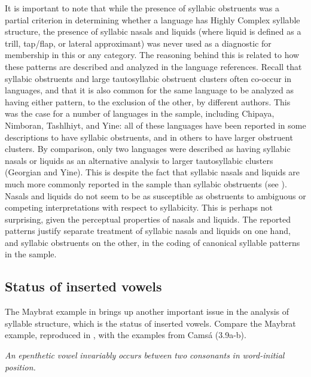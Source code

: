   It is important to note that while the presence of syllabic obstruents was a partial criterion in determining whether a language has Highly Complex syllable structure, the presence of syllabic nasals and liquids (where liquid is defined as a trill, tap/flap, or lateral approximant) was never used as a diagnostic for membership in this or any category. The reasoning behind this is related to how these patterns are described and analyzed in the language references. Recall that syllabic obstruents and large tautosyllabic obstruent clusters often co-occur in languages, and that it is also common for the same language to be analyzed as having either pattern, to the exclusion of the other, by different authors. This was the case for a number of languages in the sample, including Chipaya, Nimboran, Tashlhiyt, and Yine: all of these languages have been reported in some descriptions to have syllabic obstruents, and in others to have larger obstruent clusters. By comparison, only two languages were described as having syllabic nasals or liquids as an alternative analysis to larger tautosyllabic clusters (Georgian and Yine). This is despite the fact that syllabic nasals and liquids are much more commonly reported in the sample than syllabic obstruents (see ). Nasals and liquids do not seem to be as susceptible as obstruents to ambiguous or competing interpretations with respect to syllabicity. This is perhaps not surprising, given the perceptual properties of nasals and liquids. The reported patterns justify separate treatment of syllabic nasals and liquids on one hand, and syllabic obstruents on the other, in the coding of canonical syllable patterns in the sample.

\subsection{Status of inserted vowels}\label{sec:3.2.2}

  The Maybrat example in  brings up another important issue in the analysis of syllable structure, which is the status of inserted vowels. Compare the Maybrat example, reproduced in , with the examples from Camsá (3.9a-b).

\ea\label{ex:(3.8)}

\textit{An} \textit{epenthetic} \textit{vowel} \textit{invariably} \textit{occurs} \textit{between} \textit{two} \textit{consonants} \textit{in} \textit{word-initial} \textit{position.}

